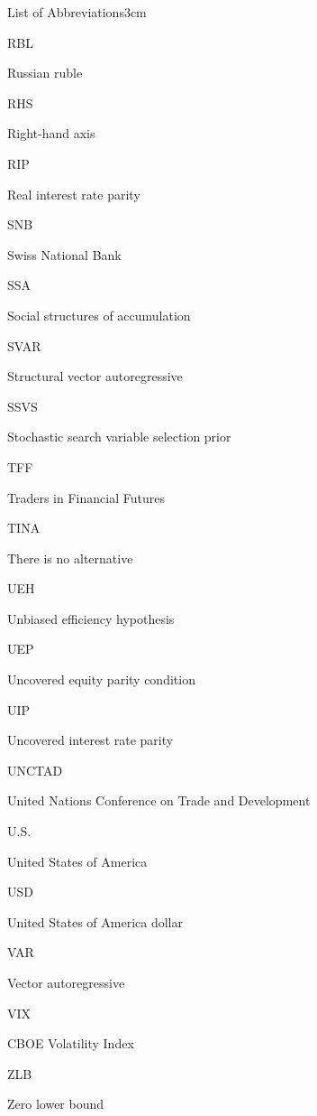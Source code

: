 \documentclass[a4paper, twoside]{templates/ociamthesis}
\begin{document}
\begin{romanpages}
\begin{mclistof}{List of Abbreviations}{3cm}
\item[RBL]

Russian ruble

\item[RHS]

Right-hand axis

\item[RIP]

Real interest rate parity

\item[SNB]

Swiss National Bank

\item[SSA]

Social structures of accumulation

\item[SVAR]

Structural vector autoregressive

\item[SSVS]

Stochastic search variable selection prior

\item[TFF]

Traders in Financial Futures

\item[TINA]

There is no alternative

\item[UEH]

Unbiased efficiency hypothesis

\item[UEP]

Uncovered equity parity condition

\item[UIP]

Uncovered interest rate parity

\item[UNCTAD]

United Nations Conference on Trade and Development

\item[U.S.]

United States of America

\item[USD]

United States of America dollar

\item[VAR]

Vector autoregressive

\item[VIX]

CBOE Volatility Index

\item[ZLB]

Zero lower bound

\end{mclistof} 


\end{romanpages}
\end{document}
